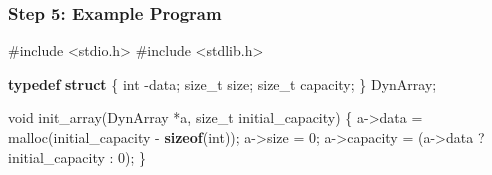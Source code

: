 \documentclass[
  letterpaper,
  DIV=11,
  numbers=noendperiod]{scrreprt}
\newenvironment{Shaded}{\begin{snugshade}}{\end{snugshade}}
\newcommand{\DataTypeTok}[1]{\textcolor[rgb]{0.68,0.00,0.00}{#1}}
\newcommand{\DecValTok}[1]{\textcolor[rgb]{0.68,0.00,0.00}{#1}}
\newcommand{\ImportTok}[1]{\textcolor[rgb]{0.00,0.46,0.62}{#1}}
\newcommand{\KeywordTok}[1]{\textcolor[rgb]{0.00,0.23,0.31}{\textbf{#1}}}
\newcommand{\NormalTok}[1]{\textcolor[rgb]{0.00,0.23,0.31}{#1}}
\newcommand{\OperatorTok}[1]{\textcolor[rgb]{0.37,0.37,0.37}{#1}}
\newcommand{\PreprocessorTok}[1]{\textcolor[rgb]{0.68,0.00,0.00}{#1}}
\begin{document}
\subsubsection{Step 5: Example Program}\label{step-5-example-program}

\begin{Shaded}
\begin{Highlighting}[]
\PreprocessorTok{\#include }\ImportTok{\textless{}stdio.h\textgreater{}}
\PreprocessorTok{\#include }\ImportTok{\textless{}stdlib.h\textgreater{}}

\KeywordTok{typedef} \KeywordTok{struct} \OperatorTok{\{}
    \DataTypeTok{int} \OperatorTok{{-}}\NormalTok{data}\OperatorTok{;}
    \DataTypeTok{size\_t}\NormalTok{ size}\OperatorTok{;}
    \DataTypeTok{size\_t}\NormalTok{ capacity}\OperatorTok{;}
\OperatorTok{\}}\NormalTok{ DynArray}\OperatorTok{;}

\DataTypeTok{void}\NormalTok{ init\_array}\OperatorTok{(}\NormalTok{DynArray }\OperatorTok{*}\NormalTok{a}\OperatorTok{,} \DataTypeTok{size\_t}\NormalTok{ initial\_capacity}\OperatorTok{)} \OperatorTok{\{}
\NormalTok{    a}\OperatorTok{{-}\textgreater{}}\NormalTok{data }\OperatorTok{=}\NormalTok{ malloc}\OperatorTok{(}\NormalTok{initial\_capacity }\OperatorTok{{-}} \KeywordTok{sizeof}\OperatorTok{(}\DataTypeTok{int}\OperatorTok{));}
\NormalTok{    a}\OperatorTok{{-}\textgreater{}}\NormalTok{size }\OperatorTok{=} \DecValTok{0}\OperatorTok{;}
\NormalTok{    a}\OperatorTok{{-}\textgreater{}}\NormalTok{capacity }\OperatorTok{=} \OperatorTok{(}\NormalTok{a}\OperatorTok{{-}\textgreater{}}\NormalTok{data }\OperatorTok{?}\NormalTok{ initial\_capacity }\OperatorTok{:} \DecValTok{0}\OperatorTok{);}
\OperatorTok{\}}


\end{Highlighting}
\end{Shaded}
\end{document}
